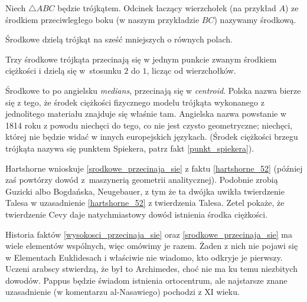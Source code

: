 \begin{definition}[środkowa]
%
    Niech $\triangle ABC$ będzie trójkątem.
    Odcinek łaczący wierzchołek (na przykład $A$) ze środkiem przeciwległego boku (w naszym przykładzie $BC$) nazywamy środkową.
\end{definition}

Środkowe dzielą trójkąt na sześć mniejszych o równych polach.

\begin{proposition}
\label{srodkowe_przecinaja_sie}%
%
    Trzy środkowe trójkąta przecinają się w jednym punkcie zwanym środkiem ciężkości i dzielą się w~stosunku $2$ do $1$, licząc od wierzchołków.
\end{proposition}

Środkowe to po angielsku \emph{medians}, przecinają się w \emph{centroid}.
Polska nazwa bierze się z tego, że środek ciężkości fizycznego modelu trójkąta wykonanego z jednolitego materiału znajduje się właśnie tam.
%
Angielska nazwa powstanie w 1814 roku z powodu niechęci do tego, co nie jest czysto geometryczne; niechęci, której nie będzie widać w innych europejskich językach.
(Środek ciężkości brzegu trójkąta nazywa się punktem Spiekera, patrz fakt \ref{punkt_spiekera}).

Hartshorne \cite[s. 52-54]{hartshorne2000} wnioskuje \ref{srodkowe_przecinaja_sie} z faktu \ref{hartshorne_52} (później zaś \cite[s. 119-120]{hartshorne2000} powtórzy dowód z~maszynerią geometrii analitycznej).
%
Podobnie zrobią Guzicki \cite[s. 220]{guzicki_2021} albo Bogdańska, Neugebauer, z tym że ta dwójka uwikła twierdzenie Talesa w uzasadnienie \ref{hartshorne_52} z twierdzenia Talesa.
%
Zetel \cite[s. 14, 25]{zetel_2020} pokaże, że twierdzenie Cevy daje natychmiastowy dowód istnienia środka ciężkości.

Historia faktów \ref{wysokosci_przecinaja_sie} oraz \ref{srodkowe_przecinaja_sie} ma wiele elementów wspólnych, więc omówimy je razem.
Żaden z nich nie pojawi się w Elementach Euklidesach i właściwie nie wiadomo, kto odkryje je pierwszy.
Uczeni arabscy stwierdzą, że był to Archimedes, choć nie ma ku temu niezbitych dowodów.
%
Pappus będzie świadom istnienia ortocentrum, ale najstarsze znane uzasadnienie (w komentarzu al-Nasawiego) pochodzi z XI wieku.
%
%

